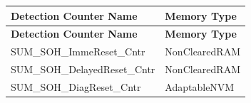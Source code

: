 \begin{longtable}{|l|l|}
\hline
\begin{minipage}{0.47\linewidth}\raggedright\vspace{.75ex}\textbf{Detection Counter Name}\vspace{.75ex}\end{minipage} & \begin{minipage}{0.47\linewidth}\raggedright\vspace{.75ex}\textbf{Memory Type}\vspace{.75ex}\end{minipage}\\
\hline\hline
\endfirsthead
\hline
\begin{minipage}{0.47\linewidth}\raggedright\vspace{.75ex}\textbf{Detection Counter Name}\vspace{.75ex}\end{minipage} & \begin{minipage}{0.47\linewidth}\raggedright\vspace{.75ex}\textbf{Memory Type}\vspace{.75ex}\end{minipage}\\
\hline\hline
\endhead
\hline
\endfoot
\hline
\endlastfoot
\begin{minipage}{0.47\linewidth}\raggedright\vspace{.75ex}SUM\_SOH\_ImmeReset\_Cntr\vspace{.75ex}\end{minipage} & \begin{minipage}{0.47\linewidth}\raggedright\vspace{.75ex}NonClearedRAM\vspace{.75ex}\end{minipage}\\\hline
\begin{minipage}{0.47\linewidth}\raggedright\vspace{.75ex}SUM\_SOH\_DelayedReset\_Cntr\vspace{.75ex}\end{minipage} & \begin{minipage}{0.47\linewidth}\raggedright\vspace{.75ex}NonClearedRAM\vspace{.75ex}\end{minipage}\\\hline
\begin{minipage}{0.47\linewidth}\raggedright\vspace{.75ex}SUM\_SOH\_DiagReset\_Cntr\vspace{.75ex}\end{minipage} & \begin{minipage}{0.47\linewidth}\raggedright\vspace{.75ex}AdaptableNVM\vspace{.75ex}\end{minipage}\\\hline

\end{longtable}
